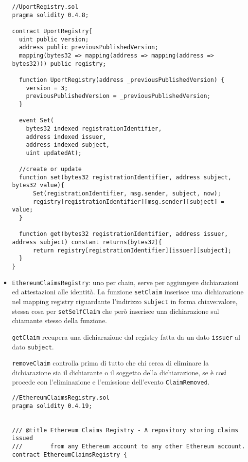 \begin{itemize}
  \begin{lstlisting}[language=Solidity, numbers=none]
//UportRegistry.sol
pragma solidity 0.4.8;

contract UportRegistry{
  uint public version;
  address public previousPublishedVersion;
  mapping(bytes32 => mapping(address => mapping(address => bytes32))) public registry;

  function UportRegistry(address _previousPublishedVersion) {
    version = 3;
    previousPublishedVersion = _previousPublishedVersion;
  }

  event Set(
    bytes32 indexed registrationIdentifier,
    address indexed issuer,
    address indexed subject,
    uint updatedAt);

  //create or update
  function set(bytes32 registrationIdentifier, address subject, bytes32 value){
      Set(registrationIdentifier, msg.sender, subject, now);
      registry[registrationIdentifier][msg.sender][subject] = value;
  }

  function get(bytes32 registrationIdentifier, address issuer, address subject) constant returns(bytes32){
      return registry[registrationIdentifier][issuer][subject];
  }
}
  \end{lstlisting}

  \item \texttt{EthereumClaimsRegistry}: uno per chain, serve per aggiungere dichiarazioni ed attestazioni
  alle identità.
  La funzione \texttt{setClaim} inserisce una dichiarazione nel mapping registry riguardante l'indirizzo \texttt{subject}
  in forma chiave:valore, stessa cosa per \texttt{setSelfClaim} che però inserisce una dichiarazione sul chiamante
  stesso della funzione.

  \texttt{getClaim} recupera una dichiarazione dal registry fatta da un dato \texttt{issuer} al dato \texttt{subject}.
  
  \texttt{removeClaim} controlla prima di tutto che chi cerca di eliminare la dichiarazione sia il dichiarante
  o il soggetto della dichiarazione, se è così procede con l'eliminazione e l'emissione dell'evento
  \texttt{ClaimRemoved}.
  
  \begin{lstlisting}[language=Solidity, numbers=none]
//EthereumClaimsRegistry.sol
pragma solidity 0.4.19;


/// @title Ethereum Claims Registry - A repository storing claims issued
///        from any Ethereum account to any other Ethereum account.
contract EthereumClaimsRegistry {


\end{lstlisting}
\end{itemize}
